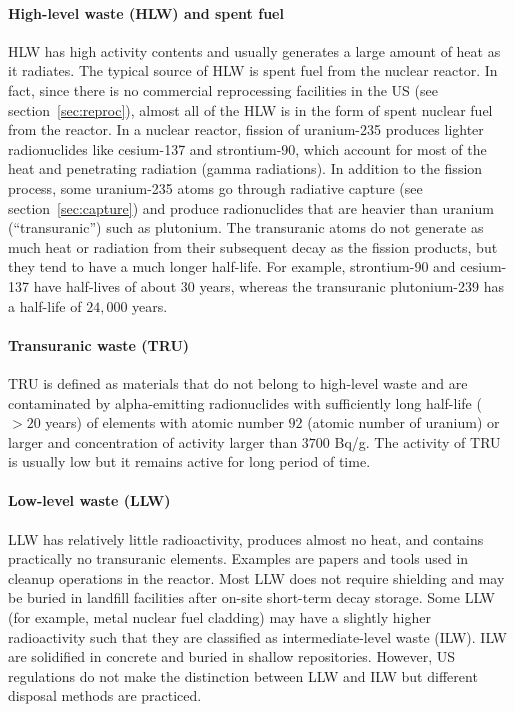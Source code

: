 \documentclass[nofootinbib,preprint,aps]{revtex4-1}
\begin{document}
    \paragraph{High-level waste (HLW) and spent fuel}
    HLW has high activity contents and usually generates a large amount of
    heat as it radiates. The typical source of HLW is spent fuel from the nuclear reactor.
    In fact, since there is no commercial reprocessing facilities in the US (see section~\ref{sec:reproc}),
    almost all of the HLW is in the form of spent nuclear fuel from the reactor. In a nuclear reactor,
    fission of uranium-235 produces lighter radionuclides like cesium-137 and strontium-90, which
    account for most of the heat and penetrating radiation (gamma radiations). In addition to
    the fission process, some uranium-235 atoms go through radiative capture
    (see section~\ref{sec:capture}) and produce radionuclides that are
    heavier than uranium (``transuranic'') such as plutonium. The transuranic atoms do not generate
    as much heat or radiation from their subsequent decay as the fission products, but they tend to have
    a much longer half-life.
    For example, strontium-90 and cesium-137 have half-lives of about $30$ years, whereas
    the transuranic plutonium-239 has a half-life of $24,000$ years.

    \paragraph{Transuranic waste (TRU)}
    TRU is defined as materials that do not belong to high-level waste and are
    contaminated by alpha-emitting radionuclides with
    sufficiently long half-life ($>20$ years) of elements with atomic number $92$ (atomic number of uranium)
    or larger and concentration of activity larger than $3700$ Bq/g.\cite{j83,s01} The activity
    of TRU is usually low but it remains active for long period of time.

    \paragraph{Low-level waste (LLW)}
    LLW has relatively little radioactivity, produces almost no heat,
    and contains practically no
    transuranic elements. Examples are papers and tools used in cleanup operations in the reactor.
    Most LLW does not require shielding and may be buried in landfill 
    facilities after on-site short-term decay storage.
    Some LLW (for example, metal nuclear fuel cladding) may have a slightly
    higher radioactivity such that they are classified
    as intermediate-level waste (ILW). ILW are solidified in concrete and buried in shallow
    repositories.\cite{s01} However, US regulations do not make the distinction
    between LLW and ILW but different disposal methods are practiced.\cite{nrc09, s01}
\end{document}
